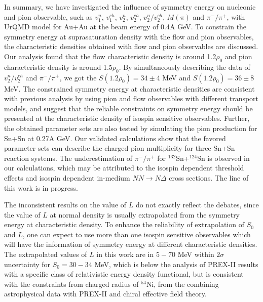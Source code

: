 \documentclass[reprint,aps,prc,twocolumn,superscriptaddress]{revtex4-1}
\begin{document}









In summary, we have investigated the influence of symmetry energy on nucleonic and pion observable, such as $v_1^{n}$, $v_1^{ch}$, $v_2^{n}$, $v_2^{ch}$, $v_2^{n}/v_2^{ch}$, $M(\pi)$ and $\pi^-/\pi^+$, with UrQMD model for Au+Au at the beam energy of 0.4A GeV. To constrain the symmetry energy at suprasaturation density with the flow and pion observables, the characteristic densities obtained with flow and pion observables are discussed. Our analysis found that the flow characteristic density is around 1.2$\rho_0$ and pion characteristic density is around 1.5$\rho_0$. By simultaneously describing the data of $v_2^n/v_2^{ch}$ and $\pi^-/\pi^+$, we got the $S(1.2\rho_0)=34\pm 4$ MeV and $S(1.2\rho_0)=36\pm 8$ MeV. The constrained symmetry energy at characteristic densities are consistent with previous analysis by using pion and flow observables with different transport models, and suggest that the reliable constraints on symmetry energy should be presented at the characteristic density of isospin sensitive observables. Further, the obtained parameter sets are also tested by simulating the pion production for Sn+Sn at 0.27A GeV. Our validated calculations show that the favored parameter sets can describe the charged pion multiplicity for three Sn+Sn reaction systems. The underestimation of $\pi^-/\pi^+$ for $^{132}$Sn+$^{124}$Sn is observed in our calculations, which may be attributed to the isospin dependent threshold effects and isospin dependent in-medium $NN\to N\Delta$ cross sections. The line of this work is in progress. 

The inconsistent results on the value of $L$ do not exactly reflect the debates, since the value of $L$ at normal density is usually extrapolated from the symmetry energy at characteristic density. To enhance the reliability of extrapolation of $S_0$ and $L$, one can expect to use more than one isospin sensitive observables which will have the information of symmetry energy at different characteristic densities. The extrapolated values of $L$ in this work are in $5-70$ MeV within $2\sigma$ uncertainty for $S_0=30-34$ MeV, which is below the analysis of PREX-II results with a specific class of relativistic energy density functional, but is consistent with the constraints from charged radius of $^{54}$Ni, from the combining astrophysical
data with PREX-II and chiral effective field theory. 
\end{document}
